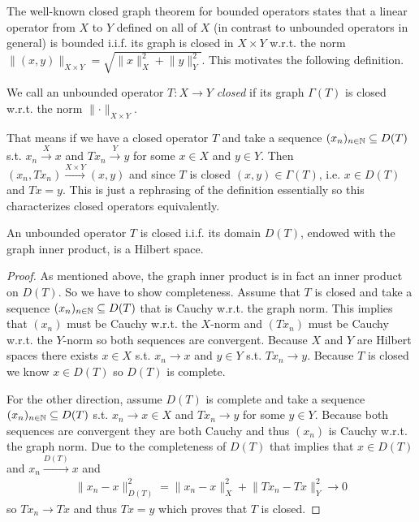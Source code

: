 \documentclass[../master_thesis.tex]{subfiles}
\begin{document}
The well-known closed graph theorem for bounded operators states that 
a linear operator from $X$ to $Y$ defined on all of $X$ 
(in contrast to unbounded operators in general) is bounded i.i.f. 
its graph is closed in $X\times Y$ w.r.t. the norm 
$\lVert (x,y) \rVert _{X\times Y} 
= \sqrt{\lVert x \rVert^2 _{X} + \lVert y \rVert^2 _{Y}}$. 
This motivates the following definition.

\begin{definition}
    We call an unbounded operator $T:X \rightarrow Y$ \textit{closed} if 
    its graph $\Gamma(T)$ is closed w.r.t. the norm 
    $\lVert \cdot \rVert _{X\times Y}$.
\end{definition}
That means if we have a closed operator $T$ and
take a sequence $(x_n)_{n\in \mathbb{N}} \subseteq D(T)$
s.t. $x_n \xrightarrow{X} x$ and $Tx_n \xrightarrow{Y} y$ for some 
$x \in X$ and $y \in Y$. Then $(x_n,Tx_n) \xrightarrow{X\times Y} (x,y)$ and 
since $T$ is closed
$(x,y) \in \Gamma(T)$, i.e. $x \in D(T)$ and $Tx = y$. This is just 
a rephrasing of the definition essentially so this characterizes closed
operators equivalently.

\begin{proposition}\label{prop:closed_operator_graph_norm}
    An unbounded operator $T$ is closed i.i.f. its domain $D(T)$, endowed with the 
    graph inner product, is a Hilbert space.
\end{proposition}
\begin{proof}
    As mentioned above, the graph inner product is in fact an inner product 
    on $D(T)$. So we have to show completeness.
    Assume that $T$ is closed and take a sequence $(x_n)_{n \in \mathbb{N}} 
    \subseteq D(T)$ that is Cauchy w.r.t. the graph norm. This implies 
    that $(x_n)$ must be Cauchy w.r.t. the $X$-norm and $(Tx_n)$ must be 
    Cauchy w.r.t. the $Y$-norm so both sequences are convergent. Because $X$ and $Y$ are Hilbert spaces 
    there exists $x \in X$ s.t. $x_n \rightarrow x$ and $y \in Y$ s.t. 
    $Tx_n \rightarrow y$. Because $T$ is closed we know 
    $x \in D(T)$ so $D(T)$ is complete.

    For the other direction, assume $D(T)$ is complete and take a sequence 
    $(x_n)_{n \in \mathbb{N}} \allowbreak\subseteq D(T)$ s.t. $x_n \rightarrow x \in X$ 
    and $Tx_n \rightarrow y$ for some $y \in Y$. Because both sequences are 
    convergent they are both Cauchy and thus $(x_n)$ is Cauchy w.r.t. the
    graph norm. Due to the completeness of $D(T)$ that implies that $x \in D(T)$
    and $x_n \xrightarrow{D(T)} x$ and 
    \begin{align*}
        \lVert x_n - x \rVert^2 _{D(T)} 
        = \lVert x_n - x \rVert^2 _X + \lVert Tx_n - Tx \rVert^2 _Y 
        \rightarrow 0
    \end{align*}
    so $T x_n \rightarrow T x$ and thus $Tx = y$ which proves that 
    $T$ is closed.
\end{proof}
\end{document}

